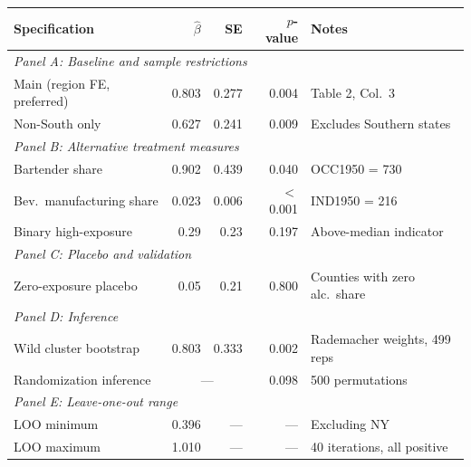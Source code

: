 
\begin{tabular}{lrrrl}
\toprule
Specification & $\hat{\beta}$ & SE & $p$-value & Notes\\
\midrule
\multicolumn{5}{l}{\emph{Panel A: Baseline and sample restrictions}}\\[3pt]
Main (region FE, preferred) & 0.803 & 0.277 & 0.004 & Table 2, Col.\ 3\\
Non-South only & 0.627 & 0.241 & 0.009 & Excludes Southern states\\[6pt]
\multicolumn{5}{l}{\emph{Panel B: Alternative treatment measures}}\\[3pt]
Bartender share & 0.902 & 0.439 & 0.040 & OCC1950 = 730\\
Bev.\ manufacturing share & 0.023 & 0.006 & $<$0.001 & IND1950 = 216\\
Binary high-exposure & 0.29 & 0.23 & 0.197 & Above-median indicator\\[6pt]
\multicolumn{5}{l}{\emph{Panel C: Placebo and validation}}\\[3pt]
Zero-exposure placebo & 0.05 & 0.21 & 0.800 & Counties with zero alc.\ share\\[6pt]
\multicolumn{5}{l}{\emph{Panel D: Inference}}\\[3pt]
Wild cluster bootstrap & 0.803 & 0.333 & 0.002 & Rademacher weights, 499 reps\\
Randomization inference & \multicolumn{2}{c}{---} & 0.098 & 500 permutations\\[6pt]
\multicolumn{5}{l}{\emph{Panel E: Leave-one-out range}}\\[3pt]
LOO minimum & 0.396 & --- & --- & Excluding NY\\
LOO maximum & 1.010 & --- & --- & 40 iterations, all positive\\
\bottomrule
\end{tabular}
